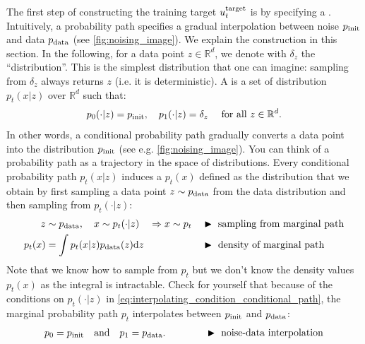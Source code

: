 The first step of constructing the training target $u^{\text{target}}_t$ is by specifying a . Intuitively, a probability path specifies a gradual interpolation between noise $p_{\rm{init}}$ and data $p_{\rm{data}}$ (see \cref{fig:noising_image}). We explain the construction in this section. In the following, for a data point $z\in\mathbb{R}^d$, we denote with $\delta_{z}$ the  ``distribution''. This is the simplest distribution that one can imagine: sampling from $\delta_{z}$ always returns $z$ (i.e. it is deterministic). A  is a set of distribution $p_t(x|z)$ over $\mathbb{R}^d$ such that:
\begin{align}
\label{eq:interpolating_condition_conditional_path}
    p_0(\cdot|z)=p_{\rm{init}}, \quad p_1(\cdot|z)=\delta_{z}\quad \text{ for all }z\in\mathbb{R}^d.
\end{align}
In other words, a conditional probability path gradually converts a  data point into the distribution $p_{\rm{init}}$ (see e.g. \cref{fig:noising_image}). You can think of a probability path as a trajectory in the space of distributions. Every conditional probability path $p_t(x|z)$ induces a  $p_t(x)$ defined as the distribution that we obtain by first sampling a data point $z\sim p_{\rm{data}}$ from the data distribution and then sampling from $p_t(\cdot|z)$:
\begin{align}
    \label{eq:marginal_prob_path}
    z&\sim p_{\rm{data}}, \quad x\sim p_t(\cdot|z)\quad \Rightarrow x\sim p_t &&\blacktriangleright\,\,\text{sampling from marginal path}\\
    p_t(x) &= \int p_t(x|z) p_{\rm{data}} (z) \mathrm{d} z &&\blacktriangleright\,\,\text{density of marginal path}
\end{align}
Note that we know how to sample from $p_t$ but we don't know the density values $p_t(x)$ as the integral is intractable. Check for yourself that because of the conditions on $p_t(\cdot|z)$ in \cref{eq:interpolating_condition_conditional_path}, the marginal probability path $p_t$ interpolates between $p_{\rm{init}}$ and $p_{\rm{data}}$:
\begin{align}
\label{eq:noise_interpolation}
p_0 =p_{\rm{init}}\quad\text{and}\quad p_1=p_{\rm{data}}.\quad\quad\quad\quad \blacktriangleright\,\,\text{noise-data interpolation}
\end{align}
